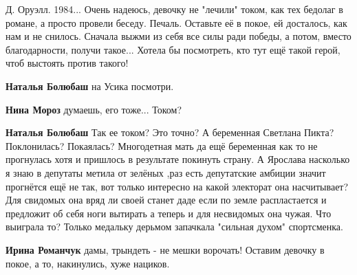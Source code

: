 \begin{itemize}
Д. Оруэлл. 1984... Очень надеюсь, девочку не "лечили" током, как тех бедолаг в
романе, а просто провели беседу. Печаль. Оставьте её в покое, ей досталось, как
нам и не снилось. Сначала выжми из себя все силы ради победы, а потом, вместо
благодарности, получи такое... Хотела бы посмотреть, кто тут ещё такой герой,
чтоб выстоять против такого!

\begin{itemize}
 
\textbf{Наталья Болюбаш} на Усика посмотри.

 
\textbf{Нина Мороз} думаешь, его тоже... Током?

 
\textbf{Наталья Болюбаш} Так ее током? Это точно? А беременная Светлана Пикта?
Поклонилась? Покаялась? Многодетная мать да ещё беременная как то не прогнулась
хотя и пришлось в результате покинуть страну. А Ярослава насколько я знаю в
депутаты метила от зелёных ,раз есть депутатские амбиции значит прогнётся ещё
не так, вот только интересно на какой электорат она насчитывает? Для свидомых
она вряд ли своей станет даде если по земле распластается и предложит об себя
ноги вытирать а теперь и для несвидомых она чужая. Что выиграла то? Только
медальку дерьмом запачкала "сильная духом" спортсменка.

 
\textbf{Ирина Романчук} дамы, трындеть - не мешки ворочать! Оставим девочку в покое, а то, накинулись, хуже нациков.


\end{itemize}
\end{itemize}
